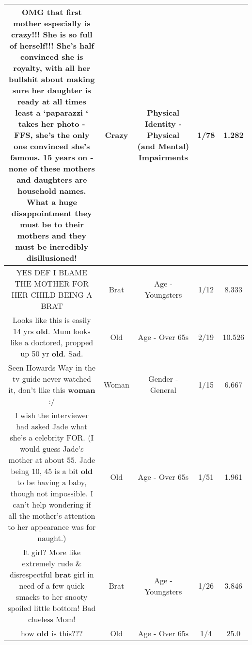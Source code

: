 \documentclass[11pt]{article}
\newlength\mylength
\begin{document}
\begin{center}
\begin{longtable}{|C{.65\mylength}|C{.30\mylength}|C{.12\mylength}|C{.12\mylength}|C{.12\mylength}|}
  \small OMG that first mother especially is \textbf{crazy}!!! She is so full of herself!!! She's half convinced she is royalty, with all her bullshit about making sure her daughter is ready at all times least a ‘paparazzi ‘ takes her photo - FFS, she's the only one convinced she's famous. 15 years on - none of these mothers and daughters are household names. What a huge disappointment they must be to their mothers and they must be incredibly disillusioned!\normalsize   & Crazy & Physical Identity - Physical (and Mental) Impairments & 1/78 & 1.282 \\  \hline
  \small YES DEF I BLAME THE MOTHER FOR HER CHILD BEING A BRAT\normalsize   & Brat & Age - Youngsters & 1/12 & 8.333 \\  \hline
  \small Looks like this is easily 14 yrs \textbf{old}. Mum looks like a doctored, propped up 50 yr \textbf{old}. Sad.\normalsize   & Old & Age - Over 65s & 2/19 & 10.526 \\  \hline
  \small Seen Howards Way in the tv guide never watched it, don't like this \textbf{woman} :/\normalsize   & Woman & Gender - General & 1/15 & 6.667 \\  \hline
  \small I wish the interviewer had asked Jade what she's a celebrity FOR.  (I would guess Jade's mother at about 55.  Jade being 10, 45 is a bit \textbf{old} to be having a baby, though not impossible.  I can't help wondering if all the mother's attention to her appearance was for naught.)\normalsize   & Old & Age - Over 65s & 1/51 & 1.961 \\  \hline
  \small It girl? More like extremely rude \& disrespectful \textbf{brat} girl in need of a few quick smacks to her snooty spoiled little bottom! Bad clueless Mom!\normalsize   & Brat & Age - Youngsters & 1/26 & 3.846 \\  \hline
  \small how \textbf{old} is this???\normalsize   & Old & Age - Over 65s & 1/4 & 25.0 \\  \hline

\end{longtable}
\end{center}
\end{document}
